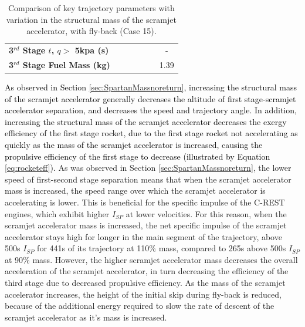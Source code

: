 \begin{table}[ht]
\begin{tabular}{l c c c c c c}
		\\
		\textbf{3$^{rd}$ Stage $t$, $q >$ 5kpa (s)}
		& \thirdqOverFivemSPARTANNinety
		& \thirdqOverFivemSPARTANNinetyFive
		& \thirdqOverFivemSPARTANStandard
		& \thirdqOverFivemSPARTANOneHundredFive
		& \thirdqOverFivemSPARTANOneHundredTen
		& -
		\\
		\textbf{3$^{rd}$ Stage Fuel Mass (kg)}
		& \thirdmFuelmSPARTANNinety
		& \thirdmFuelmSPARTANNinetyFive
		& \thirdmFuelmSPARTANStandard
		& \thirdmFuelmSPARTANOneHundredFive
		& \thirdmFuelmSPARTANOneHundredTen
		&1.39
		\\
		\hline 
	\end{tabular} 
	\caption{Comparison of key trajectory parameters with variation in the structural mass of the scramjet accelerator, with fly-back (Case 15).}
	\label{tab:comparison101}
\end{table}

\textcolor{black}{
As observed in Section \ref{sec:SpartanMassnoreturn}, increasing the structural mass of the scramjet accelerator generally decreases the altitude of first stage-scramjet accelerator separation, and decreases the speed and trajectory angle. 
In addition, increasing the structural mass of the scramjet accelerator decreases the exergy efficiency of the first stage rocket, due to the first stage rocket not accelerating as quickly as the mass of the scramjet accelerator is increased, causing the propulsive efficiency of the first stage to decrease (illustrated by Equation \ref{eq:rocketeff}).}
 As was observed in Section \ref{sec:SpartanMassnoreturn}, the lower speed of first-second stage separation means that when the scramjet accelerator mass is increased, the speed range over which the scramjet accelerator is accelerating is lower. This is beneficial for the specific impulse of the C-REST engines, which exhibit higher $I_{SP}$ at lower velocities. For this reason, when the scramjet accelerator mass is increased, the net specific impulse of the scramjet accelerator stays high for longer in the main segment of the trajectory, above 500s $I_{SP}$ for \textcolor{black}{441}s of its trajectory at 110\% mass, compared to \textcolor{black}{265}s above 500s $I_{SP}$ at 90\% mass. 
However, the higher scramjet accelerator mass decreases the overall acceleration of the scramjet accelerator, in turn decreasing the efficiency of the third stage due to decreased propulsive efficiency. As the mass of the scramjet accelerator increases, the height of the initial skip during fly-back is reduced, because of the additional energy required to slow the rate of descent of the scramjet accelerator as it's mass is increased. 



